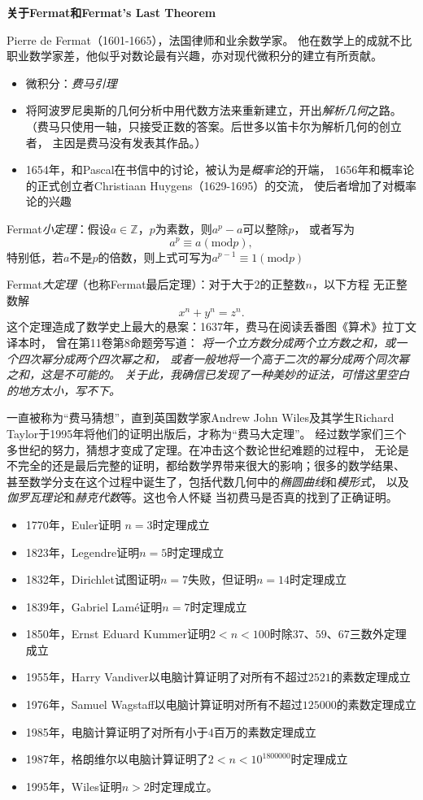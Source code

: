 \begin{shaded}
	{\bf 关于Fermat和Fermat's Last Theorem}
	
	Pierre de Fermat（1601-1665），法国律师和业余数学家。
	他在数学上的成就不比职业数学家差，他似乎对数论最有兴趣，亦对现代微积分的建立有所贡献。
	\begin{itemize}
	  \item 微积分：{\it 费马引理}
	  \item 将阿波罗尼奥斯的几何分析中用代数方法来重新建立，开出{\it 解析几何}之路。
	  （费马只使用一轴，只接受正数的答案。后世多以笛卡尔为解析几何的创立者，
	  主因是费马没有发表其作品。）
	  \item 1654年，和Pascal在书信中的讨论，被认为是{\it 概率论}的开端，
	  1656年和概率论的正式创立者Christiaan Huygens（1629-1695）的交流，
	  使后者增加了对概率论的兴趣
	\end{itemize}
	
	Fermat{\it 小定理}：假设$a\in\mathbb{Z}$，$p$为素数，则$a^p-a$可以整除$p$，
	或者写为
	$$a^p\equiv a(\mathrm{mod}p),$$
	特别低，若$a$不是$p$的倍数，则上式可写为$a^{p-1}\equiv 1(\mathrm{mod} p)$
	
	Fermat{\it 大定理}（也称Fermat最后定理）：对于大于$2$的正整数$n$，以下方程
	无正整数解
	$$x^n+y^n=z^n.$$
	这个定理造成了数学史上最大的悬案：1637年，费马在阅读丢番图《算术》拉丁文译本时，
	曾在第11卷第8命题旁写道：
	{\it 将一个立方数分成两个立方数之和，或一个四次幂分成两个四次幂之和，
	或者一般地将一个高于二次的幂分成两个同次幂之和，这是不可能的。
	关于此，我确信已发现了一种美妙的证法，可惜这里空白的地方太小，写不下。}
	
	一直被称为“费马猜想”，直到英国数学家Andrew John Wiles及其学生Richard
	Taylor于1995年将他们的证明出版后，才称为“费马大定理”。
	经过数学家们三个多世纪的努力，猜想才变成了定理。在冲击这个数论世纪难题的过程中，
	无论是不完全的还是最后完整的证明，都给数学界带来很大的影响；很多的数学结果、
	甚至数学分支在这个过程中诞生了，包括代数几何中的{\it 椭圆曲线}和{\it 模形式}，
	以及{\it	伽罗瓦理论}和{\it 赫克代数}等。这也令人怀疑
	当初费马是否真的找到了正确证明。
	
	\begin{itemize}
	  \item 1770年，Euler证明 $n=3$时定理成立
	  \item 1823年，Legendre证明$n=5$时定理成立
      \item 1832年，Dirichlet试图证明$n=7$失败，但证明$n=14$时定理成立
	  \item 1839年，Gabriel Lamé证明$n=7$时定理成立
	  \item 1850年，Ernst Eduard Kummer证明$2<n<100$时除$37$、$59$、$67$三数外定理成立
	  \item 1955年，Harry Vandiver以电脑计算证明了对所有不超过$2521$的素数定理成立
	  \item 1976年，Samuel Wagstaff以电脑计算证明对所有不超过$125000$的素数定理成立
	  \item 1985年，电脑计算证明了对所有小于$4$百万的素数定理成立
	  \item 1987年，格朗维尔以电脑计算证明了$2<n<10^{{1800000}}$时定理成立
	  \item 1995年，Wiles证明$n>2$时定理成立。
	\end{itemize}
	

\end{shaded}
